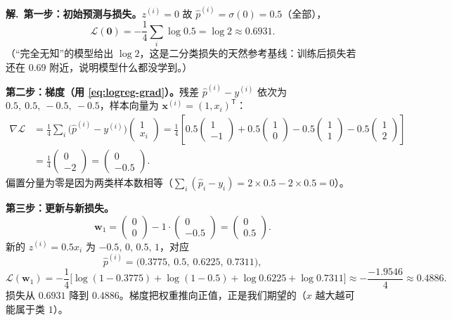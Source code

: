 \documentclass[UTF8,a4paper,11pt]{ctexart}
\theoremstyle{definition}
\theoremstyle{plain}
\theoremstyle{remark}
\newcommand{\Loss}{\mathcal{L}}
\newcommand{\T}{^{\mathsf{T}}}
\begin{document}
\noindent\textbf{解.}\ \textbf{第一步：初始预测与损失。}$z^{(i)}=0$ 故 $\hat p^{(i)}=\sigma(0)=0.5$（全部），
\[
  \Loss(\bm{0})=-\frac14\sum_{i}\log0.5=\log2\approx0.6931 .
\]
（“完全无知”的模型给出 $\log2$，这是二分类损失的天然参考基线：训练后损失若还在 $0.69$ 附近，说明模型什么都没学到。）

\textbf{第二步：梯度（用 \eqref{eq:logreg-grad}）。}残差 $\hat p^{(i)}-y^{(i)}$ 依次为 $0.5,\ 0.5,\ -0.5,\ -0.5$，样本向量为 $\bm{x}^{(i)}=(1,x_i)\T$：
\begin{align*}
  \nabla\Loss&=\frac14\sum_i\big(\hat p^{(i)}-y^{(i)}\big)\begin{pmatrix}1\\x_i\end{pmatrix}
  =\frac14\left[0.5\begin{pmatrix}1\\-1\end{pmatrix}+0.5\begin{pmatrix}1\\0\end{pmatrix}
  -0.5\begin{pmatrix}1\\1\end{pmatrix}-0.5\begin{pmatrix}1\\2\end{pmatrix}\right]\\[4pt]
  &=\frac14\begin{pmatrix}0\\-2\end{pmatrix}
  =\begin{pmatrix}0\\-0.5\end{pmatrix}.
\end{align*}
偏置分量为零是因为两类样本数相等（$\sum_i(\hat p_i-y_i)=2\times0.5-2\times0.5=0$）。

\textbf{第三步：更新与新损失。}
\[
  \bm{w}_1=\begin{pmatrix}0\\0\end{pmatrix}-1\cdot\begin{pmatrix}0\\-0.5\end{pmatrix}=\begin{pmatrix}0\\0.5\end{pmatrix}.
\]
新的 $z^{(i)}=0.5x_i$ 为 $-0.5,\,0,\,0.5,\,1$，对应
\[
  \hat p^{(i)}=\big(0.3775,\ 0.5,\ 0.6225,\ 0.7311\big),
\]
\[
  \Loss(\bm{w}_1)=-\frac14\Big[\log(1-0.3775)+\log(1-0.5)+\log0.6225+\log0.7311\Big]
  \approx-\frac{-1.9546}{4}\approx0.4886 .
\]
损失从 $0.6931$ 降到 $0.4886$。梯度把权重推向正值，正是我们期望的（$x$ 越大越可能属于类 $1$）。
\end{document}
